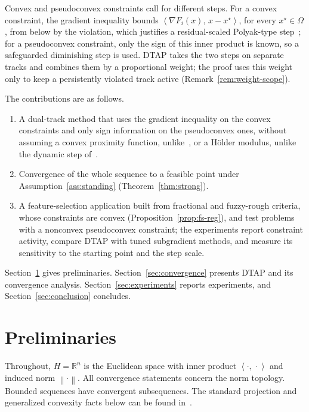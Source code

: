 \documentclass[]{interact}
\theoremstyle{plain}
\theoremstyle{definition}
\theoremstyle{remark}
\newcommand{\R}{\mathbb{R}}
\newcommand{\norm}[1]{\left\lVert #1 \right\rVert}
\newcommand{\inner}[2]{\left\langle #1,\, #2 \right\rangle}
\newcommand{\dtap}{\textsc{DTAP}}
\begin{document}
Convex and pseudoconvex constraints call for different steps. For a convex constraint, the gradient inequality bounds $\inner{\nabla F_i(x)}{x-x^\star}$, for every $x^\star\in\Omega$, from below by the violation, which justifies a residual-scaled Polyak-type step~\citep{polyak1969,lopez2012}; for a pseudoconvex constraint, only the sign of this inner product is known, so a safeguarded diminishing step is used. DTAP takes the two steps on separate tracks and combines them by a proportional weight; the proof uses this weight only to keep a persistently violated track active (Remark~\ref{rem:weight-scope}).

The contributions are as follows.
\begin{enumerate}[label=\textbf{C\arabic*.},leftmargin=2.4em,itemsep=3pt]
\item A dual-track method that uses the gradient inequality on the convex constraints and only sign information on the pseudoconvex ones, without assuming a convex proximity function, unlike~\citep{li2013nsfp}, or a H\"older modulus, unlike the dynamic step of~\citep{hu2022quasi}.
\item Convergence of the whole sequence to a feasible point under Assumption~\ref{ass:standing} (Theorem~\ref{thm:strong}).
\item A feature-selection application built from fractional and fuzzy-rough criteria, whose constraints are convex (Proposition~\ref{prop:fs-reg}), and test problems with a nonconvex pseudoconvex constraint; the experiments report constraint activity, compare DTAP with tuned subgradient methods, and measure its sensitivity to the starting point and the step scale.
\end{enumerate}

Section~\ref{sec:prelim} gives preliminaries. Section~\ref{sec:convergence} presents \dtap{} and its convergence analysis. Section~\ref{sec:experiments} reports experiments, and Section~\ref{sec:conclusion} concludes.


\section{Preliminaries}\label{sec:prelim}
Throughout, $H=\R^n$ is the Euclidean space with inner product $\inner{\cdot}{\cdot}$ and induced norm $\norm{\cdot}$. All convergence statements concern the norm topology. Bounded sequences have convergent subsequences. The standard projection and generalized convexity facts below can be found in~\citep{bauschke2011,mangasarian1994}.
\end{document}
